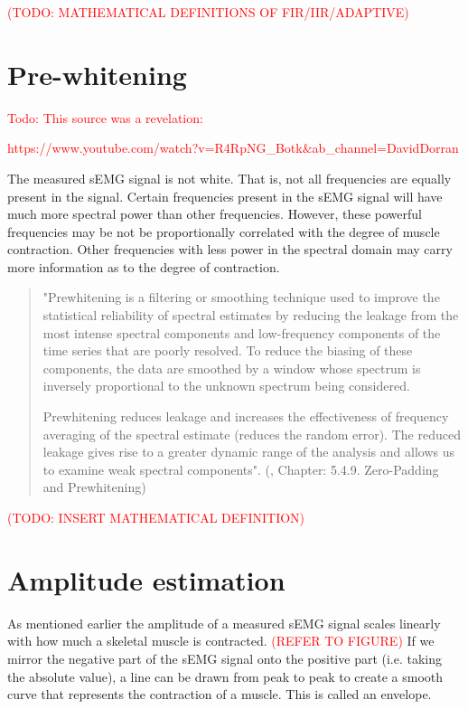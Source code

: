 \textcolor{red}{(TODO: MATHEMATICAL DEFINITIONS OF FIR/IIR/ADAPTIVE)}

\section{Pre-whitening}

\textcolor{red}{Todo: This source was a revelation:

https://www.youtube.com/watch?v=R4RpNG_Botk&ab_channel=DavidDorran}


The measured sEMG signal is not white. That is, not all frequencies are equally present in the signal. Certain frequencies present in the sEMG signal will have much more spectral power than other frequencies. However, these powerful frequencies may be not be proportionally correlated with the degree of muscle contraction. Other frequencies with less power in the spectral domain may carry more information as to the degree of contraction.

\begin{quote}
    "Prewhitening is a filtering or smoothing technique used to improve the statistical reliability of spectral estimates by reducing the leakage from the most intense spectral components and low-frequency components of the time series that are poorly resolved. To reduce the biasing of these components, the data are smoothed by a window whose spectrum is inversely proportional to the unknown spectrum being considered. 
    
    Prewhitening reduces leakage and increases the effectiveness of frequency averaging of the spectral estimate (reduces the random error). The reduced leakage gives rise to a greater dynamic range of the analysis and allows us to examine weak spectral components".
    (\cite{time_series_analysis_methods_whitening}, Chapter: 5.4.9. Zero-Padding and Prewhitening)
\end{quote}

\textcolor{red}{(TODO: INSERT MATHEMATICAL DEFINITION)}

\section{Amplitude estimation}
As mentioned earlier the amplitude of a measured sEMG signal scales linearly with how much a skeletal muscle is contracted. \textcolor{red}{(REFER TO FIGURE)} If we mirror the negative part of the sEMG signal onto the positive part (i.e. taking the absolute value), a line can be drawn from peak to peak to create a smooth curve that represents the contraction of a muscle. This is called an envelope.

